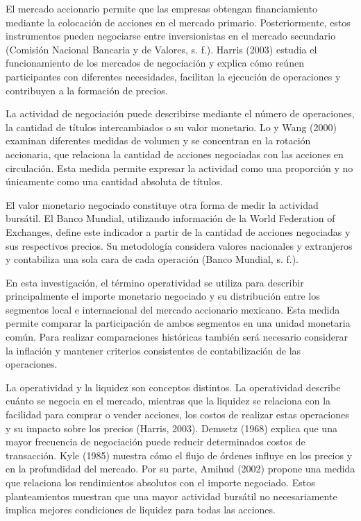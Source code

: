 El mercado accionario permite que las empresas obtengan financiamiento mediante la colocación de acciones en el mercado primario. Posteriormente, estos instrumentos pueden negociarse entre inversionistas en el mercado secundario (Comisión Nacional Bancaria y de Valores, s. f.). Harris (2003) estudia el funcionamiento de los mercados de negociación y explica cómo reúnen participantes con diferentes necesidades, facilitan la ejecución de operaciones y contribuyen a la formación de precios.

La actividad de negociación puede describirse mediante el número de operaciones, la cantidad de títulos intercambiados o su valor monetario. Lo y Wang (2000) examinan diferentes medidas de volumen y se concentran en la rotación accionaria, que relaciona la cantidad de acciones negociadas con las acciones en circulación. Esta medida permite expresar la actividad como una proporción y no únicamente como una cantidad absoluta de títulos.

El valor monetario negociado constituye otra forma de medir la actividad bursátil. El Banco Mundial, utilizando información de la World Federation of Exchanges, define este indicador a partir de la cantidad de acciones negociadas y sus respectivos precios. Su metodología considera valores nacionales y extranjeros y contabiliza una sola cara de cada operación (Banco Mundial, s. f.).

En esta investigación, el término operatividad se utiliza para describir principalmente el importe monetario negociado y su distribución entre los segmentos local e internacional del mercado accionario mexicano. Esta medida permite comparar la participación de ambos segmentos en una unidad monetaria común. Para realizar comparaciones históricas también será necesario considerar la inflación y mantener criterios consistentes de contabilización de las operaciones.

La operatividad y la liquidez son conceptos distintos. La operatividad describe cuánto se negocia en el mercado, mientras que la liquidez se relaciona con la facilidad para comprar o vender acciones, los costos de realizar estas operaciones y su impacto sobre los precios (Harris, 2003). Demsetz (1968) explica que una mayor frecuencia de negociación puede reducir determinados costos de transacción. Kyle (1985) muestra cómo el flujo de órdenes influye en los precios y en la profundidad del mercado. Por su parte, Amihud (2002) propone una medida que relaciona los rendimientos absolutos con el importe negociado. Estos planteamientos muestran que una mayor actividad bursátil no necesariamente implica mejores condiciones de liquidez para todas las acciones.

